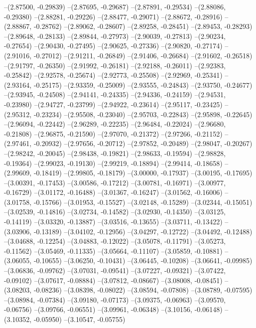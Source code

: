 --(2.87500, -0.29839)
--(2.87695, -0.29687)
--(2.87891, -0.29534)
--(2.88086, -0.29380)
--(2.88281, -0.29226)
--(2.88477, -0.29071)
--(2.88672, -0.28916)
--(2.88867, -0.28762)
--(2.89062, -0.28607)
--(2.89258, -0.28451)
--(2.89453, -0.28293)
--(2.89648, -0.28133)
--(2.89844, -0.27973)
--(2.90039, -0.27813)
--(2.90234, -0.27654)
--(2.90430, -0.27495)
--(2.90625, -0.27336)
--(2.90820, -0.27174)
--(2.91016, -0.27012)
--(2.91211, -0.26849)
--(2.91406, -0.26684)
--(2.91602, -0.26518)
--(2.91797, -0.26350)
--(2.91992, -0.26181)
--(2.92188, -0.26011)
--(2.92383, -0.25842)
--(2.92578, -0.25674)
--(2.92773, -0.25508)
--(2.92969, -0.25341)
--(2.93164, -0.25175)
--(2.93359, -0.25009)
--(2.93555, -0.24843)
--(2.93750, -0.24677)
--(2.93945, -0.24508)
--(2.94141, -0.24335)
--(2.94336, -0.24159)
--(2.94531, -0.23980)
--(2.94727, -0.23799)
--(2.94922, -0.23614)
--(2.95117, -0.23425)
--(2.95312, -0.23234)
--(2.95508, -0.23040)
--(2.95703, -0.22843)
--(2.95898, -0.22645)
--(2.96094, -0.22442)
--(2.96289, -0.22235)
--(2.96484, -0.22024)
--(2.96680, -0.21808)
--(2.96875, -0.21590)
--(2.97070, -0.21372)
--(2.97266, -0.21152)
--(2.97461, -0.20932)
--(2.97656, -0.20712)
--(2.97852, -0.20489)
--(2.98047, -0.20267)
--(2.98242, -0.20045)
--(2.98438, -0.19821)
--(2.98633, -0.19594)
--(2.98828, -0.19364)
--(2.99023, -0.19130)
--(2.99219, -0.18894)
--(2.99414, -0.18658)
--(2.99609, -0.18419)
--(2.99805, -0.18179)
--(3.00000, -0.17937)
--(3.00195, -0.17695)
--(3.00391, -0.17453)
--(3.00586, -0.17212)
--(3.00781, -0.16971)
--(3.00977, -0.16729)
--(3.01172, -0.16488)
--(3.01367, -0.16247)
--(3.01562, -0.16006)
--(3.01758, -0.15766)
--(3.01953, -0.15527)
--(3.02148, -0.15289)
--(3.02344, -0.15051)
--(3.02539, -0.14816)
--(3.02734, -0.14582)
--(3.02930, -0.14350)
--(3.03125, -0.14119)
--(3.03320, -0.13887)
--(3.03516, -0.13655)
--(3.03711, -0.13422)
--(3.03906, -0.13189)
--(3.04102, -0.12956)
--(3.04297, -0.12722)
--(3.04492, -0.12488)
--(3.04688, -0.12254)
--(3.04883, -0.12022)
--(3.05078, -0.11791)
--(3.05273, -0.11562)
--(3.05469, -0.11335)
--(3.05664, -0.11107)
--(3.05859, -0.10881)
--(3.06055, -0.10655)
--(3.06250, -0.10431)
--(3.06445, -0.10208)
--(3.06641, -0.09985)
--(3.06836, -0.09762)
--(3.07031, -0.09541)
--(3.07227, -0.09321)
--(3.07422, -0.09102)
--(3.07617, -0.08884)
--(3.07812, -0.08667)
--(3.08008, -0.08451)
--(3.08203, -0.08236)
--(3.08398, -0.08022)
--(3.08594, -0.07808)
--(3.08789, -0.07595)
--(3.08984, -0.07384)
--(3.09180, -0.07173)
--(3.09375, -0.06963)
--(3.09570, -0.06756)
--(3.09766, -0.06551)
--(3.09961, -0.06348)
--(3.10156, -0.06148)
--(3.10352, -0.05950)
--(3.10547, -0.05755)
